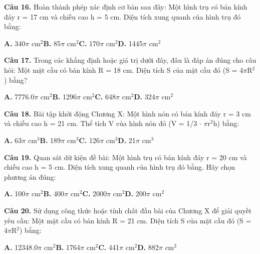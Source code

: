 \documentclass[11pt,a4paper]{article}
\begin{document}
\textbf{\color{primary} Câu 16.} Hoàn thành phép xác định cơ bản sau đây: Một hình trụ có bán kính đáy r = 17 cm và chiều cao h = 5 cm. Diện tích xung quanh của hình trụ đó bằng:\par
\hspace*{1.5em}\textbf{A.} 340$\pi$ cm$^2$\quad\quad \textbf{B.} 85$\pi$ cm$^2$\quad\quad \textbf{C.} 170$\pi$ cm$^2$\quad\quad \textbf{D.} 1445$\pi$ cm$^2$\par\vspace{2pt}
\textbf{\color{primary} Câu 17.} Trong các khẳng định hoặc giá trị dưới đây, đâu là đáp án đúng cho câu hỏi: Một mặt cầu có bán kính R = 18 cm. Diện tích S của mặt cầu đó (S = 4$\pi$R$^2$) bằng?\par
\hspace*{1.5em}\textbf{A.} 7776.0$\pi$ cm$^2$\quad\quad \textbf{B.} 1296$\pi$ cm$^2$\quad\quad \textbf{C.} 648$\pi$ cm$^2$\quad\quad \textbf{D.} 324$\pi$ cm$^2$\par\vspace{2pt}
\textbf{\color{primary} Câu 18.} Bài tập khởi động Chương X: Một hình nón có bán kính đáy r = 3 cm và chiều cao h = 21 cm. Thể tích V của hình nón đó (V = 1/3 $\cdot$ $\pi$r$^2$h) bằng:\par
\hspace*{1.5em}\textbf{A.} 63$\pi$ cm$^3$\quad\quad \textbf{B.} 189$\pi$ cm$^3$\quad\quad \textbf{C.} 126$\pi$ cm$^3$\quad\quad \textbf{D.} 21$\pi$ cm$^3$\par\vspace{2pt}
\textbf{\color{primary} Câu 19.} Quan sát dữ kiện đề bài: Một hình trụ có bán kính đáy r = 20 cm và chiều cao h = 5 cm. Diện tích xung quanh của hình trụ đó bằng. Hãy chọn phương án đúng:\par
\hspace*{1.5em}\textbf{A.} 100$\pi$ cm$^2$\quad\quad \textbf{B.} 400$\pi$ cm$^2$\quad\quad \textbf{C.} 2000$\pi$ cm$^2$\quad\quad \textbf{D.} 200$\pi$ cm$^2$\par\vspace{2pt}
\textbf{\color{primary} Câu 20.} Sử dụng công thức hoặc tính chất đầu bài của Chương X để giải quyết yêu cầu: Một mặt cầu có bán kính R = 21 cm. Diện tích S của mặt cầu đó (S = 4$\pi$R$^2$) bằng:\par
\hspace*{1.5em}\textbf{A.} 12348.0$\pi$ cm$^2$\quad\quad \textbf{B.} 1764$\pi$ cm$^2$\quad\quad \textbf{C.} 441$\pi$ cm$^2$\quad\quad \textbf{D.} 882$\pi$ cm$^2$\par\vspace{2pt}
\end{document}

